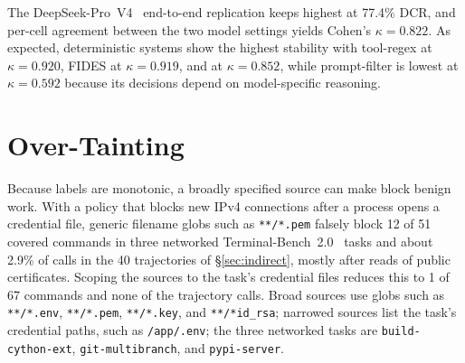 The DeepSeek-Pro~V4~\cite{deepseek2026v4} end-to-end replication keeps \sys{} highest at 77.4\% DCR, and per-cell agreement between the two model settings yields Cohen's $\kappa=0.822$.
As expected, deterministic systems show the highest stability with tool-regex at $\kappa=0.920$, FIDES at $\kappa=0.919$, and \sys{} at $\kappa=0.852$, while prompt-filter is lowest at $\kappa=0.592$ because its decisions depend on model-specific reasoning.

\section{Over-Tainting}
\label{sec:supp:utility}
Because labels are monotonic, a broadly specified source can make \sys{} block benign work.
With a policy that blocks new IPv4 connections after a process opens a credential file, generic filename globs such as \texttt{**/*.pem} falsely block 12 of 51 covered commands in three networked Terminal-Bench~2.0~\cite{terminalbench2} tasks and about 2.9\% of calls in the 40 trajectories of \S\ref{sec:indirect}, mostly after reads of public certificates.
Scoping the sources to the task's credential files reduces this to 1 of 67 commands and none of the trajectory calls.
Broad sources use globs such as \texttt{**/*.env}, \texttt{**/*.pem}, \texttt{**/*.key}, and \texttt{**/*id\_rsa}; narrowed sources list the task's credential paths, such as \texttt{/app/.env}; the three networked tasks are \texttt{build-cython-ext}, \texttt{git-multibranch}, and \texttt{pypi-server}.
